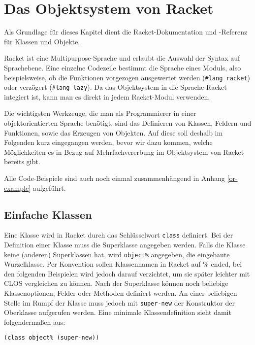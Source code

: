 \section{Das Objektsystem von Racket}
Als Grundlage für dieses Kapitel dient die Racket-Dokumentation \cite{racketguide-classes} und -Referenz \cite{racketref-classes} für Klassen und Objekte.

Racket ist eine Multipurpose-Sprache und erlaubt die Auswahl der Syntax auf Sprachebene. Eine einzelne Codezeile bestimmt die Sprache eines Moduls, also beispielsweise, ob die Funktionen vorgezogen ausgewertet werden (\texttt{\#lang racket}) oder verzögert (\texttt{\#lang lazy}). Da das Objektsystem in die Sprache Racket integiert ist, kann man es direkt in jedem Racket-Modul verwenden.


Die wichtigsten Werkzeuge, die man als Programmierer in einer objektorientierten Sprache benötigt, sind das Definieren von Klassen, Feldern und Funktionen, sowie das Erzeugen von Objekten. Auf diese soll deshalb im Folgenden kurz eingegangen werden, bevor wir dazu kommen, welche Möglichkeiten es in Bezug auf Mehrfachvererbung im Objektsystem von Racket bereits gibt.

Alle Code-Beispiele sind auch noch einmal zusammenhängend in Anhang \ref{or-example} aufgeführt. 

\subsection{Einfache Klassen}

Eine Klasse wird in Racket durch das Schlüsselwort \texttt{class} definiert. Bei der Definition einer Klasse muss die Superklasse angegeben werden. Falls die Klasse keine (anderen) Superklassen hat, wird \texttt{object\%} angegeben, die eingebaute Wurzelklasse. Per Konvention sollen Klassennamen in Racket auf \% ended, bei den folgenden Beispielen wird jedoch darauf verzichtet, um sie später leichter mit CLOS vergleichen zu können. Nach der Superklasse können noch beliebige Klassenoptionen, Felder oder Methoden definiert werden. An einer beliebigen Stelle im Rumpf der Klasse muss jedoch mit \texttt{super-new} der Konstruktor der Oberklasse aufgerufen werden. Eine minimale Klassendefinition sieht damit folgendermaßen aus:

\begin{lstlisting}
(class object% (super-new))
\end{lstlisting}

